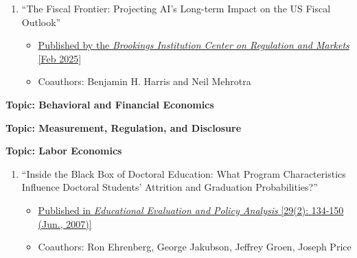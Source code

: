 \documentclass[11pt]{article}
\begin{document}
\begin{enumerate}
\item ``The Fiscal Frontier: Projecting AI's Long-term Impact on the US Fiscal Outlook''
\begin{itemize}
\vspace*{-.07in}
	\item \href{https://www.brookings.edu/articles/the-fiscal-frontier-projecting-ais-long-term-impact-on-the-us-fiscal-outlook/}{Published by the {\it Brookings Institution Center on Regulation and Markets} [Feb 2025]}
\vspace*{-.07in}
	\item Coauthors: Benjamin H. Harris and Neil Mehrotra
\end{itemize}

\end{enumerate}

\medskip
\vspace*{.2in}
{\bf Topic: Behavioral and Financial Economics} \\
\vspace*{-.2in}
\begin{enumerate}
    
\end{enumerate}

\medskip
\vspace*{.2in}
{\bf Topic: Measurement, Regulation, and Disclosure} \\
\vspace*{-.2in}
\begin{enumerate}
     
\end{enumerate}

\medskip
\vspace*{.1in}
{\bf Topic: Labor Economics} \\
\vspace*{-.2in}
\begin{enumerate}
\item``Inside the Black Box of Doctoral Education: What Program Characteristics Influence Doctoral Students' Attrition and Graduation Probabilities?''
\begin{itemize}
\vspace*{-.07in}
	\item \href{https://www.jstor.org/stable/30128037?seq=1#page_scan_tab_contents}{Published in {\it Educational Evaluation and Policy Analysis} [29(2): 134-150 (Jun., 2007)]}
\vspace*{-.07in}
	\item Coauthors: Ron Ehrenberg, George Jakubson, Jeffrey Groen, Joseph Price
\end{itemize}
\end{enumerate}
\end{document}
